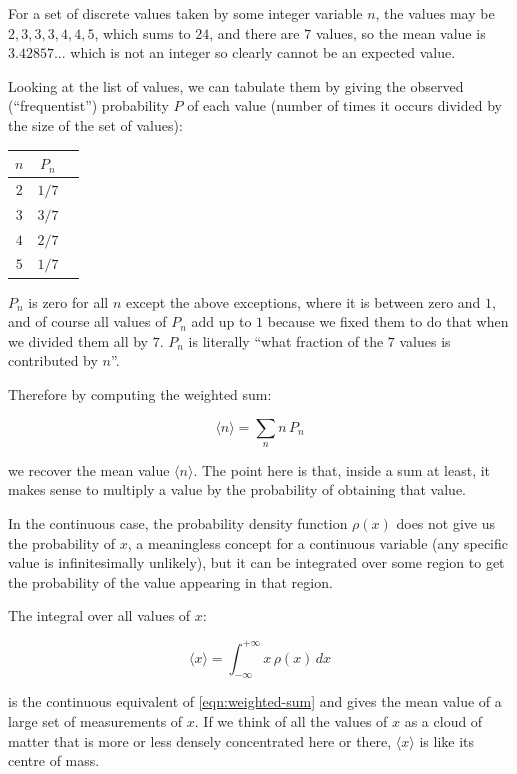 For a set of discrete values taken by some integer variable $n$, the values may be $2, 3, 3, 3, 4, 4, 5$, which sums to $24$, and there are $7$ values, so the mean value is $3.42857...$ which is not an integer so clearly cannot be an expected value.

Looking at the list of values, we can tabulate them by giving the observed (``frequentist'') probability $P$ of each value (number of times it occurs divided by the size of the set of values):

\begin{center}
    \begin{tabular}{ c|c|c }
        $n$ & $P_n$ \\
        \hline
        $2$ & $1/7$  \\
        $3$ & $3/7$  \\
        $4$ & $2/7$  \\
        $5$ & $1/7$
    \end{tabular}
\end{center}

$P_n$ is zero for all $n$ except the above exceptions, where it is between zero and $1$, and of course all values of $P_n$ add up to $1$ because we fixed them to do that when we divided them all by $7$. $P_n$ is literally ``what fraction of the $7$ values is contributed by $n$''.

Therefore by computing the weighted sum:

\begin{equation}
   \langle {n} \rangle = \sum_n{n\,P_n} 
   \label{eqn:weighted-sum}
\end{equation}

we recover the mean value $\langle{n}\rangle$. The point here is that, inside a sum at least, it makes sense to multiply a value by the probability of obtaining that value.

In the continuous case, the probability density function $\rho(x)$ does not give us the probability of $x$, a meaningless concept for a continuous variable (any specific value is infinitesimally unlikely), but it can be integrated over some region to get the probability of the value appearing in that region.

The integral over all values of $x$:

$$
\langle x \rangle =
\int_{-\infty}^{+\infty}
x\,\rho(x)
\,dx
$$

is the continuous equivalent of \eqref{eqn:weighted-sum} and gives the mean value of a large set of measurements of $x$. If we think of all the values of $x$ as a cloud of matter that is more or less densely concentrated here or there, $\langle x \rangle$ is like its centre of mass.

